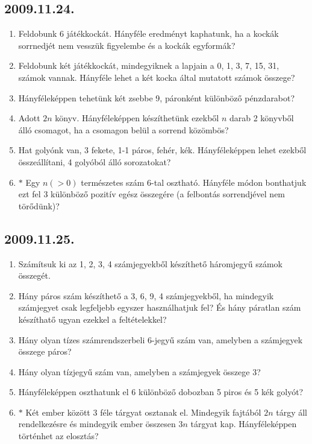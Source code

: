\documentclass{article}
\begin{document}
\subsection*{2009.11.24.}
\begin{enumerate}
\item Feldobunk 6 játékkockát. Hányféle eredményt kaphatunk, ha a kockák sorrnedjét nem vesszük figyelembe és a kockák egyformák?
\item Feldobunk két játékkockát, mindegyiknek a lapjain a 0, 1, 3, 7, 15, 31, számok vannak. Hányféle  lehet a két kocka által mutatott számok összege?
\item Hányféleképpen tehetünk két zsebbe 9, páronként különböző pénzdarabot?
\item Adott $2n$ könyv. Hányféleképpen készíthetünk ezekből $n$ darab 2 könyvből álló csomagot, ha a csomagon belül a sorrend közömbös?
\item Hat golyónk van, 3 fekete, 1-1 páros, fehér, kék. Hányféleképpen lehet ezekből összeállítani, 4 golyóból álló sorozatokat?
\item $*$ Egy $n(>0)$ természetes szám 6-tal osztható. Hányféle módon bonthatjuk ezt fel 3 különböző pozitív egész összegére (a felbontás sorrendjével nem törődünk)?
\end{enumerate}

\subsection*{2009.11.25.}
\begin{enumerate}
\item Számítsuk ki az 1, 2, 3, 4 számjegyekből készíthető háromjegyű számok összegét.
\item Hány páros szám készíthető a 3, 6, 9, 4 számjegyekből, ha mindegyik számjegyet csak legfeljebb egyszer használhatjuk fel? És hány páratlan szám készíthatő ugyan ezekkel a feltételekkel?
\item Hány olyan tízes számrendszerbeli 6-jegyű szám van, amelyben a számjegyek összege páros?
\item Hány olyan tízjegyű szám van, amelyben a számjegyek összege 3?
\item Hányféleképpen oszthatunk el 6 különböző dobozban 5 piros és 5 kék golyót?
\item $*$ Két ember között 3 féle tárgyat osztanak el. Mindegyik fajtából $2n$ tárgy áll rendelkezésre és mindegyik ember összesen $3n$ tárgyat kap. Hányféleképpen történhet az elosztás?
\end{enumerate}
\end{document}
